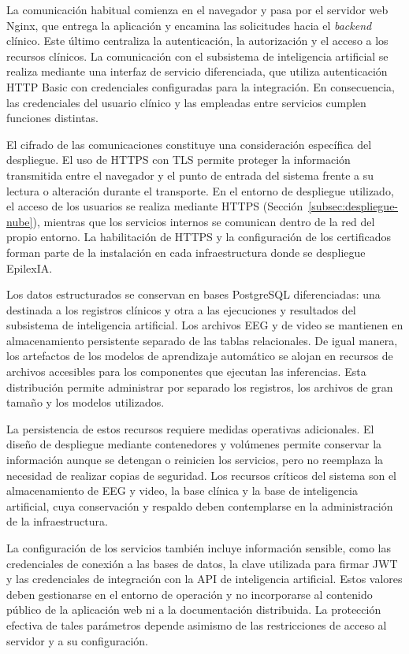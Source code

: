 La comunicación habitual comienza en el navegador y pasa por el servidor web Nginx, que entrega la aplicación y encamina las solicitudes hacia el \textit{backend} clínico. Este último centraliza la autenticación, la autorización y el acceso a los recursos clínicos. La comunicación con el subsistema de inteligencia artificial se realiza mediante una interfaz de servicio diferenciada, que utiliza autenticación HTTP Basic con credenciales configuradas para la integración. En consecuencia, las credenciales del usuario clínico y las empleadas entre servicios cumplen funciones distintas.

El cifrado de las comunicaciones constituye una consideración específica del despliegue. El uso de HTTPS con TLS permite proteger la información transmitida entre el navegador y el punto de entrada del sistema frente a su lectura o alteración durante el transporte. En el entorno de despliegue utilizado, el acceso de los usuarios se realiza mediante HTTPS (Sección~\ref{subsec:despliegue-nube}), mientras que los servicios internos se comunican dentro de la red del propio entorno. La habilitación de HTTPS y la configuración de los certificados forman parte de la instalación en cada infraestructura donde se despliegue EpilexIA.

Los datos estructurados se conservan en bases PostgreSQL diferenciadas: una destinada a los registros clínicos y otra a las ejecuciones y resultados del subsistema de inteligencia artificial. Los archivos EEG y de video se mantienen en almacenamiento persistente separado de las tablas relacionales. De igual manera, los artefactos de los modelos de aprendizaje automático se alojan en recursos de archivos accesibles para los componentes que ejecutan las inferencias. Esta distribución permite administrar por separado los registros, los archivos de gran tamaño y los modelos utilizados.

La persistencia de estos recursos requiere medidas operativas adicionales. El diseño de despliegue mediante contenedores y volúmenes permite conservar la información aunque se detengan o reinicien los servicios, pero no reemplaza la necesidad de realizar copias de seguridad. Los recursos críticos del sistema son el almacenamiento de EEG y video, la base clínica y la base de inteligencia artificial, cuya conservación y respaldo deben contemplarse en la administración de la infraestructura.

La configuración de los servicios también incluye información sensible, como las credenciales de conexión a las bases de datos, la clave utilizada para firmar JWT y las credenciales de integración con la API de inteligencia artificial. Estos valores deben gestionarse en el entorno de operación y no incorporarse al contenido público de la aplicación web ni a la documentación distribuida. La protección efectiva de tales parámetros depende asimismo de las restricciones de acceso al servidor y a su configuración.

